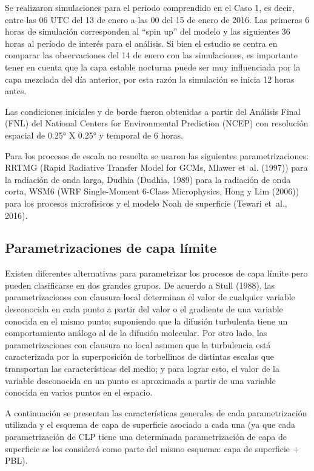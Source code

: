 \documentclass[12pt,spanish,oneside, a4paper]{book}
\begin{document}
Se realizaron simulaciones para el periodo comprendido en el Caso 1, es
decir, entre las 06 UTC del 13 de enero a las 00 del 15 de enero de
2016. Las primeras 6 horas de simulación corresponden al ``spin up'' del
modelo y las siguientes 36 horas al período de interés para el análisis.
Si bien el estudio se centra en comparar las observaciones del 14 de
enero con las simulaciones, es importante tener en cuenta que la capa
estable nocturna puede ser muy influenciada por la capa mezclada del día
anterior, por esta razón la simulación se inicia 12 horas antes.

Las condiciones iniciales y de borde fueron obtenidas a partir del
Análisis Final (FNL) del National Centers for Environmental Prediction
(NCEP) con resolución espacial de 0.25° X 0.25° y temporal de 6 horas.

Para los procesos de escala no resuelta se usaron las siguientes
parametrizaciones: RRTMG (Rapid Radiative Transfer Model for GCMs,
Mlawer et~al. (1997)) para la radiación de onda larga, Dudhia (Dudhia,
1989) para la radiación de onda corta, WSM6 (WRF Single-Moment 6-Class
Microphysics, Hong y Lim (2006)) para los procesos microfísicos y el
modelo Noah de superficie (Tewari et~al., 2016).

\subsection{Parametrizaciones de capa
límite}\label{parametrizaciones-de-capa-limite}

Existen diferentes alternativas para parametrizar los procesos de capa
límite pero pueden clasificarse en dos grandes grupos. De acuerdo a
Stull (1988), las parametrizaciones con clausura local determinan el
valor de cualquier variable desconocida en cada punto a partir del valor
o el gradiente de una variable conocida en el mismo punto; suponiendo
que la difusión turbulenta tiene un comportamiento análogo al de la
difusión molecular. Por otro lado, las parametrizaciones con clausura no
local asumen que la turbulencia está caracterizada por la superposición
de torbellinos de distintas escalas que transportan las características
del medio; y para lograr esto, el valor de la variable desconocida en un
punto es aproximada a partir de una variable conocida en varios puntos
en el espacio.

A continuación se presentan las características generales de cada
parametrización utilizada y el esquema de capa de superficie asociado a
cada una (ya que cada parametrización de CLP tiene una determinada
parametrización de capa de superficie se los consideró como parte del
mismo esquema: capa de superficie + PBL).
\end{document}
